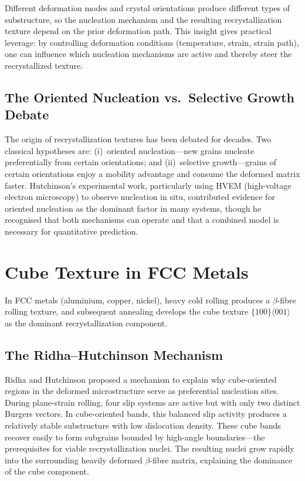 \documentclass[11pt,a4paper]{article}
\begin{document}
Different deformation modes and crystal orientations produce different
types of substructure, so the nucleation mechanism and the resulting
recrystallization texture depend on the prior deformation path.  This
insight gives practical leverage: by controlling deformation conditions
(temperature, strain, strain path), one can influence which nucleation
mechanisms are active and thereby steer the recrystallized texture.

\subsection{The Oriented Nucleation vs.\ Selective Growth Debate}

The origin of recrystallization textures has been debated for decades.
Two classical hypotheses are: (i)~oriented nucleation---new grains
nucleate preferentially from certain orientations; and (ii)~selective
growth---grains of certain orientations enjoy a mobility advantage and
consume the deformed matrix faster.  Hutchinson's experimental work,
particularly using HVEM (high-voltage electron microscopy) to observe
nucleation in situ, contributed evidence for oriented nucleation as the
dominant factor in many systems, though he recognised that both
mechanisms can operate and that a combined model is necessary for
quantitative prediction.

\section{Cube Texture in FCC Metals}
\label{sec:cube}

In FCC metals (aluminium, copper, nickel), heavy cold rolling produces a
$\beta$-fibre rolling texture, and subsequent annealing develops the
cube texture $\{100\}\langle 001\rangle$ as the dominant recrystallization
component.

\subsection{The Ridha--Hutchinson Mechanism}

Ridha and Hutchinson \cite{Ridha1982} proposed a mechanism to explain
why cube-oriented regions in the deformed microstructure serve as
preferential nucleation sites.  During plane-strain rolling, four slip
systems are active but with only two distinct Burgers vectors.  In
cube-oriented bands, this balanced slip activity produces a relatively
stable substructure with low dislocation density.  These cube bands
recover easily to form subgrains bounded by high-angle boundaries---the
prerequisites for viable recrystallization nuclei.  The resulting nuclei
grow rapidly into the surrounding heavily deformed $\beta$-fibre matrix,
explaining the dominance of the cube component.
\end{document}
